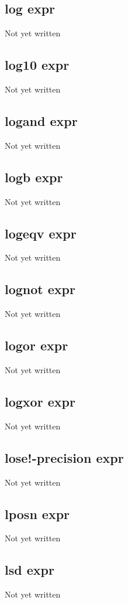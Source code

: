 \documentclass[a4paper,11pt]{article}
\begin{document}
\subsection{\ttfamily log expr}
Not yet written

\subsection{\ttfamily log10 expr}
Not yet written

\subsection{\ttfamily logand expr}
Not yet written

\subsection{\ttfamily logb expr}
Not yet written

\subsection{\ttfamily logeqv expr}
Not yet written

\subsection{\ttfamily lognot expr}
Not yet written

\subsection{\ttfamily logor expr}
Not yet written

\subsection{\ttfamily logxor expr}
Not yet written

\subsection{\ttfamily lose!-precision expr}
Not yet written

\subsection{\ttfamily lposn expr}
Not yet written

\subsection{\ttfamily lsd expr}
Not yet written
\end{document}
